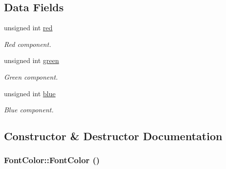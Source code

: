 \subsection*{Data Fields}
\begin{CompactItemize}
\item 
\hypertarget{struct_font_color_c8239f8b8a384f8aea88b5c722bca5d3}{
unsigned int \hyperlink{struct_font_color_c8239f8b8a384f8aea88b5c722bca5d3}{red}}
\label{struct_font_color_c8239f8b8a384f8aea88b5c722bca5d3}

\begin{CompactList}\small\item\em Red component. \item\end{CompactList}\item 
\hypertarget{struct_font_color_a44da3bcb5ab54c9e353795e2b665845}{
unsigned int \hyperlink{struct_font_color_a44da3bcb5ab54c9e353795e2b665845}{green}}
\label{struct_font_color_a44da3bcb5ab54c9e353795e2b665845}

\begin{CompactList}\small\item\em Green component. \item\end{CompactList}\item 
\hypertarget{struct_font_color_82808b069e5c057f443aa2eddb6f5b71}{
unsigned int \hyperlink{struct_font_color_82808b069e5c057f443aa2eddb6f5b71}{blue}}
\label{struct_font_color_82808b069e5c057f443aa2eddb6f5b71}

\begin{CompactList}\small\item\em Blue component. \item\end{CompactList}\end{CompactItemize}


\subsection{Constructor \& Destructor Documentation}
\hypertarget{struct_font_color_c96e70b5ab153ea18d1e3196f79da1ab}{
\subsubsection[FontColor]{\setlength{\rightskip}{0pt plus 5cm}FontColor::FontColor ()}}
\label{struct_font_color_c96e70b5ab153ea18d1e3196f79da1ab}


